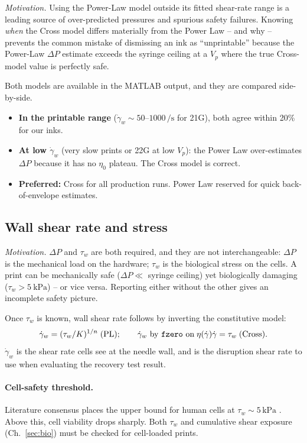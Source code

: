 \documentclass[11pt,a4paper]{article}
\newcommand{\gd}{\dot{\gamma}}
\begin{document}
\emph{Motivation.} Using the Power-Law model outside its fitted shear-rate
range is a leading source of over-predicted pressures and spurious safety
failures. Knowing \emph{when} the Cross model differs materially from the
Power Law -- and why -- prevents the common mistake of dismissing an ink as
``unprintable'' because the Power-Law $\Delta P$ estimate exceeds the syringe
ceiling at a $V_p$ where the true Cross-model value is perfectly safe.

Both models are available in the MATLAB output, and they are compared
side-by-side.

\begin{itemize}[leftmargin=1.6em,itemsep=2pt]
\item \textbf{In the printable range} ($\gd_w\sim 50$--$1000\,\si{\per\s}$
  for 21G), both agree within 20\% for our inks.
\item \textbf{At low $\gd_w$} (very slow prints or 22G at low $V_p$):
  the Power Law over-estimates $\Delta P$ because it has no $\eta_0$
  plateau. The Cross model is correct.
\item \textbf{Preferred:} Cross for all production runs. Power Law
  reserved for quick back-of-envelope estimates.
\end{itemize}

\subsection{Wall shear rate and stress}
\label{sec:wall_shear}

\emph{Motivation.} $\Delta P$ and $\tau_w$ are both required, and they are
not interchangeable: $\Delta P$ is the mechanical load on the hardware;
$\tau_w$ is the biological stress on the cells. A print can be mechanically
safe ($\Delta P\ll$ syringe ceiling) yet biologically damaging
($\tau_w>\SI{5}{\kPa}$) -- or vice versa. Reporting either without the other
gives an incomplete safety picture.

Once $\tau_w$ is known, wall shear rate follows by inverting the
constitutive model:
\begin{equation}
\gd_w = (\tau_w/K)^{1/n} \;\text{(PL)}; \qquad
\gd_w\text{ by \texttt{fzero} on}\; \eta(\gd)\gd=\tau_w \;\text{(Cross)}.
\label{eq:gdot_w}
\end{equation}
$\gd_w$ is the shear rate cells see at the needle wall, and is the
disruption shear rate to use when evaluating the recovery test result.

\paragraph{Cell-safety threshold.}
Literature consensus places the upper bound for human cells at
$\tau_w\sim 5\,\si{\kPa}$ \citep{BlaeserEtAl2016}. Above this, cell
viability drops sharply. Both $\tau_w$ and cumulative shear exposure
(Ch.~\ref{sec:bio}) must be checked for cell-loaded prints.
\end{document}
